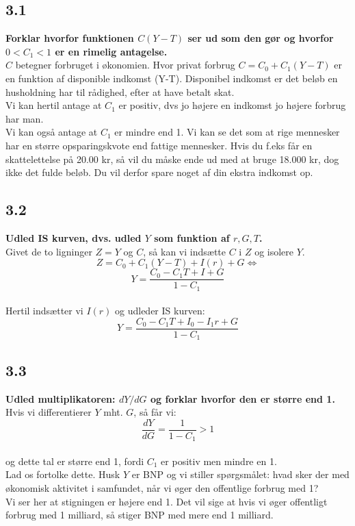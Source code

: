 \documentclass[a4paper, 12pt]{article}
\begin{document}
\subsection*{3.1}
\textbf{Forklar hvorfor funktionen $C(Y-T)$ ser ud som den gør og hvorfor $0 < C_{1} < 1$ er en rimelig antagelse.}
\\
$C$ betegner forbruget i økonomien. Hvor privat forbrug $C = C_{0} + C_{1}(Y-T)$ er en funktion af disponible indkomst (Y-T). Disponibel indkomst er det beløb en husholdning har til rådighed, efter at have betalt skat.
\\
Vi kan hertil antage at $C_{1}$ er positiv, dvs jo højere en indkomst jo højere forbrug har man.
\\
Vi kan også antage at $C_{1}$ er mindre end 1. Vi kan se det som at rige mennesker har en større opsparingskvote end fattige mennesker. Hvis du f.eks får en skattelettelse på 20.00 kr, så vil du måske ende ud med at bruge 18.000 kr, dog ikke det fulde beløb. Du vil derfor spare noget af din ekstra indkomst op.

\subsection*{3.2}
\textbf{Udled IS kurven, dvs. udled $Y$ som funktion af $r,G,T$.}
\\
Givet de to ligninger $Z = Y$ og $C$, så kan vi indsætte $C$ i $Z$ og isolere $Y$.
$$Z = C_{0} + C_{1}(Y-T) + I(r) + G \Leftrightarrow$$
$$Y = \dfrac{C_{0} - C_{1}T + I + G}{1-C_{1}}$$
\\
Hertil indsætter vi $I(r)$ og udleder IS kurven:
$$Y=\dfrac{C_{0} - C_{1}T + I_{0} - I_{1}r + G}{1-C_{1}}$$

\subsection*{3.3}
\textbf{Udled multiplikatoren: $dY/dG$ og forklar hvorfor den er større end 1.}
\\
Hvis vi differentierer $Y$ mht. $G$, så får vi:
$$\dfrac{dY}{dG} = \dfrac{1}{1 - C_{1}} > 1$$
\\
og dette tal er større end 1, fordi $C_{1}$ er positiv men mindre en 1.
\\
Lad os fortolke dette. Husk $Y$ er BNP og vi stiller spørgsmålet: hvad sker der med økonomisk aktivitet i samfundet, når vi øger den offentlige forbrug med 1?
\\
Vi ser her at stigningen er højere end 1. Det vil sige at hvis vi øger offentligt forbrug med 1 milliard, så stiger BNP med mere end 1 milliard.
\end{document}
